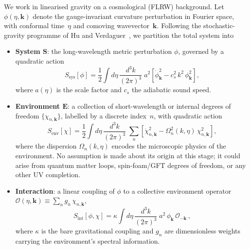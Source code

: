\documentclass[12pt,a4paper]{article}
\begin{document}
We work in linearised gravity on a cosmological (FLRW) background.
Let $\phi(\eta,\mathbf{k})$ denote the gauge-invariant curvature
perturbation in Fourier space, with conformal time~$\eta$ and comoving
wavevector~$\mathbf{k}$.  Following the stochastic-gravity programme
of Hu and Verdaguer~\cite{HuVerdaguer2008}, we partition the total
system into

\begin{itemize}
\item \textbf{System $\boldsymbol{S}$}: the long-wavelength metric
  perturbation $\phi$, governed by a quadratic action
  \begin{equation}\label{eq:Ssys}
    S_{\mathrm{sys}}[\phi]
    = \frac{1}{2}\int d\eta\,\frac{d^{3}k}{(2\pi)^{3}}\;
      a^{2}\!\left[\dot{\phi}_{\mathbf{k}}^{2}
      - c_{s}^{2}\,k^{2}\,\phi_{\mathbf{k}}^{2}\right],
  \end{equation}
  where $a(\eta)$ is the scale factor and $c_{s}$ the adiabatic sound
  speed.

\item \textbf{Environment $\boldsymbol{E}$}: a collection of
  short-wavelength or internal degrees of freedom
  $\{\chi_{n,\mathbf{k}}\}$, labelled by a discrete index~$n$, with
  quadratic action
  \begin{equation}\label{eq:Senv}
    S_{\mathrm{env}}[\chi]
    = \frac{1}{2}\int d\eta\,\frac{d^{3}k}{(2\pi)^{3}}\;
      \sum_{n}\left[\dot{\chi}_{n,\mathbf{k}}^{2}
      - \Omega_{n}^{2}(k,\eta)\,\chi_{n,\mathbf{k}}^{2}\right],
  \end{equation}
  where the dispersion $\Omega_{n}(k,\eta)$ encodes the microscopic
  physics of the environment.  No assumption is made about its origin
  at this stage; it could arise from quantum matter loops,
  spin-foam/GFT degrees of freedom, or any other UV completion.

\item \textbf{Interaction}: a linear coupling of $\phi$ to a
  collective environment operator
  $\mathcal{O}(\eta,\mathbf{k})\equiv\sum_{n}g_{n}\,\chi_{n,\mathbf{k}}$,
  \begin{equation}\label{eq:Sint}
    S_{\mathrm{int}}[\phi,\chi]
    = \kappa\int d\eta\,\frac{d^{3}k}{(2\pi)^{3}}\;
      a^{2}\,\phi_{\mathbf{k}}\,
      \mathcal{O}_{-\mathbf{k}}\,,
  \end{equation}
  where $\kappa$ is the bare gravitational coupling and $g_{n}$ are
  dimensionless weights carrying the environment's spectral
  information.
\end{itemize}
\end{document}
